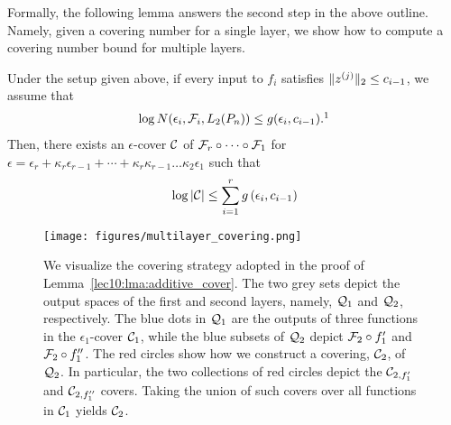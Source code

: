 Formally, the following lemma answers the second step in the above outline. Namely, given a covering number for a single layer, we show how to compute a covering number bound for multiple layers.
\begin{lemma}
	Under the setup given above, if every input to $f_i$ satisfies $\|z^{(j)}\|_2 \leq c_{i - 1}$, we assume that  
	\begin{align}
	\log N(\epsilon_i, \cF_i, L_2(P_n)) \leq g(\epsilon_i, c_{i - 1}).\footnotemark \label{lec10:eqn:single_cover_bound}
	\end{align}
	Then, there exists an $\epsilon$-cover $\mathcal C$ of $\mathcal F_r \circ \cdots \circ \mathcal F_1$ for $\epsilon = \epsilon_r + \kappa_r\epsilon_{r-1} + \cdots + \kappa_r\kappa_{r-1}\dots\kappa_2\epsilon_1$ such that
	\begin{align}
	\log \left\lvert\mathcal C\right\rvert \leq \sum_{i=1}^{r} g\left(\epsilon_i, c_{i-1}\right)
	\end{align}
	\label{lec10:lma:additive_cover}
\end{lemma}
\begin{figure}[ht!]
	\begin{center}
		\texttt{[image: figures/multilayer\_covering.png]}
	\end{center}
	\caption{We visualize the covering strategy adopted in the proof of Lemma~\ref{lec10:lma:additive_cover}. The two grey sets depict the output spaces of the first and second layers, namely, $\mathcal Q_1$ and $\mathcal Q_2$, respectively. The blue dots in $\mathcal Q_1$ are the outputs of three functions in the $\epsilon_1$-cover $\mathcal C_1$, while the blue subsets of $\mathcal Q_2$ depict $\mathcal F_2 \circ f_1'$ and $\mathcal F_2 \circ f_1''$. The red circles show how we construct a covering, $\mathcal C_2$, of $\mathcal Q_2$. In particular, the two collections of red circles depict the $\mathcal C_{2, f_1'}$ and $\mathcal C_{2, f_1''}$ covers. Taking the union of such covers over all functions in $\mathcal C_1$ yields $\mathcal C_2$.}
	\label{lec10:fig:multilayer-covering}
\end{figure}
